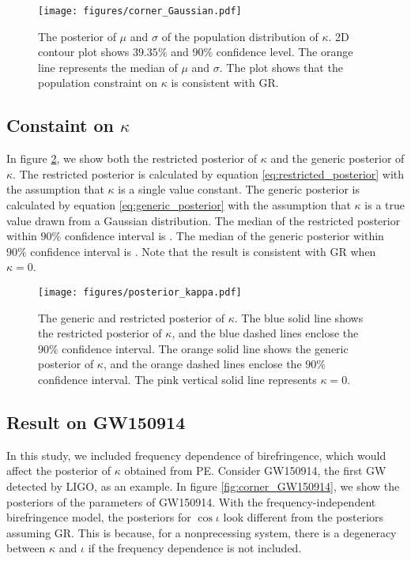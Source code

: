 \documentclass[aps,prd,twocolumn,superscriptaddress,preprintnumbers,floatfix,nofootinbib]{revtex4-2}
\begin{document}
\begin{figure}[h]
    \texttt{[image: figures/corner\_Gaussian.pdf]}
    \caption{
        The posterior of $\mu$ and $\sigma$ of the population distribution of $\kappa$.
        2D contour plot shows $39.35\%$ and $90\%$ confidence level.
        The orange line represents the median of $\mu$ and $\sigma$.
        The plot shows that the population constraint on $\kappa$ is consistent with GR.
    }
    \label{fig:corner_Gaussian}
\end{figure}

\subsection{Constaint on $\kappa$}
In figure \ref{fig:posterior_kappa}, we show both the restricted posterior of $\kappa$ and the generic posterior of $\kappa$.
The restricted posterior is calculated by equation \ref{eq:restricted_posterior} with the assumption that $\kappa$ is a single value constant.
The generic posterior is calculated by equation \ref{eq:generic_posterior} with the assumption that $\kappa$ is a true value drawn from a Gaussian distribution.
The median of the restricted posterior within $90\%$ confidence interval is .
The median of the generic posterior within $90\%$ confidence interval is .
Note that the result is consistent with GR when $\kappa=0$.

\begin{figure}[h]
    \texttt{[image: figures/posterior\_kappa.pdf]}
    \caption{
        The generic and restricted posterior of $\kappa$.
        The blue solid line shows the restricted posterior of $\kappa$, and the blue dashed lines enclose the $90\%$ confidence interval.
        The orange solid line shows the generic posterior of $\kappa$, and the orange dashed lines enclose the $90\%$ confidence interval.
        The pink vertical solid line represents $\kappa=0$.
    }
    \label{fig:posterior_kappa}
\end{figure}


\subsection{Result on GW150914}
In this study, we included frequency dependence of birefringence, which would affect the posterior of $\kappa$ obtained from PE.
Consider GW150914, the first GW detected by LIGO, as an example.
In figure \ref{fig:corner_GW150914}, we show the posteriors of the parameters of GW150914.
With the frequency-independent birefringence model, the posteriors for $\cos\iota$ look different from the posteriors assuming GR.
This is because, for a nonprecessing system, there is a degeneracy between $\kappa$ and $\iota$ if the frequency dependence is not included.
\end{document}
